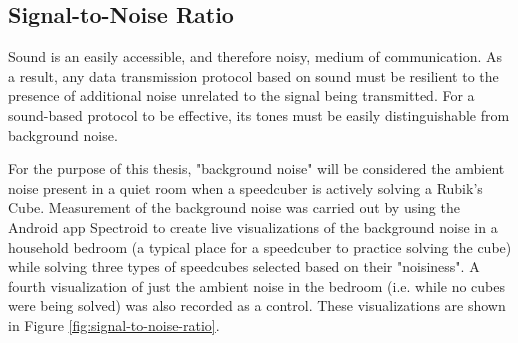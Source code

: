 \subsection{Signal-to-Noise Ratio}
\label{subsec:signal-to-noise-ratio}

Sound is an easily accessible, and therefore noisy, medium of
communication. As a result, any data transmission protocol based on
sound must be resilient to the presence of additional noise unrelated
to the signal being transmitted. For a sound-based protocol to be
effective, its tones must be easily distinguishable from background
noise.

For the purpose of this thesis, "background noise" will be considered
the ambient noise present in a quiet room when a speedcuber is actively
solving a Rubik's Cube. Measurement of the background noise was carried
out by using the Android app Spectroid \cite{googleplay-spectroid} to
create live visualizations of the background noise in a household
bedroom (a typical place for a speedcuber to practice solving the cube)
while solving three types of speedcubes selected based on their
"noisiness". A fourth visualization of just the ambient noise in the
bedroom (i.e. while no cubes were being solved) was also recorded as a
control. These visualizations are shown in Figure
\ref{fig:signal-to-noise-ratio}.

